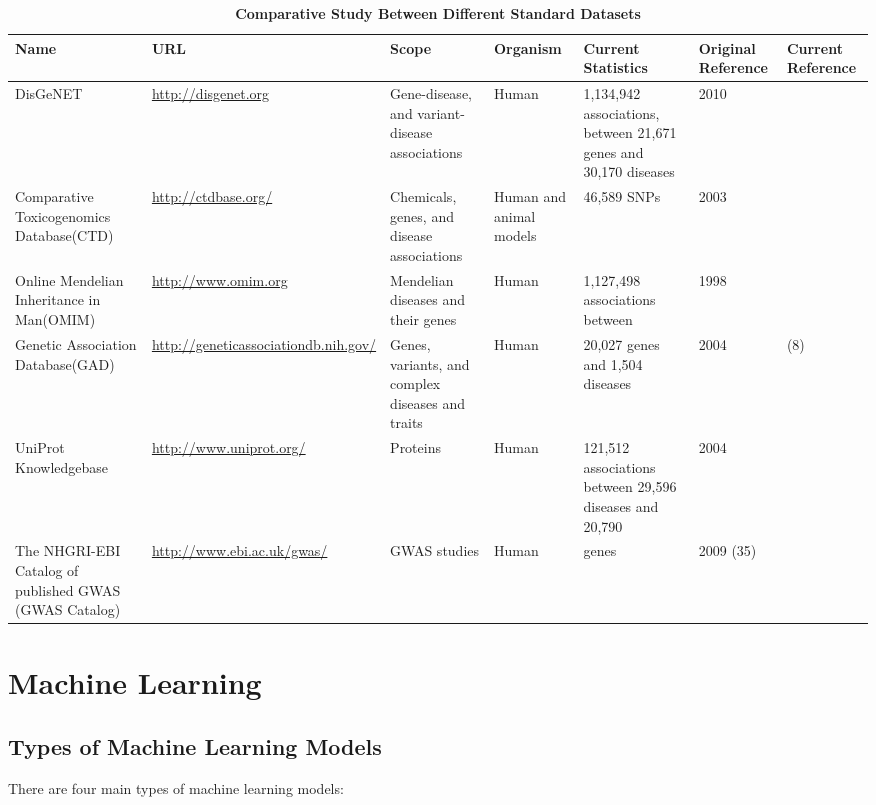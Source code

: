 \begin{table}
		\begin{tabularx}{\textwidth}{|X|X|X|X|X|X|X|}
			\hline 
			\textbf{Name} & \textbf{URL} & \textbf{Scope} & \textbf{Organism} & \textbf{Current Statistics} & \textbf{Original Reference} & \textbf{Current Reference} \\
			\hline 
			DisGeNET & \url{http://disgenet.org} & Gene-disease, and variant-disease associations & Human & 1,134,942 associations, between 21,671 genes and 30,170 diseases & 2010 \cite{31} & \cite{4} \\
			Comparative Toxicogenomics Database(CTD) & \url{http://ctdbase.org/} & Chemicals, genes, and disease associations & Human and animal models & 46,589 SNPs & 2003 \cite{32} & \cite{3} \\
			Online Mendelian Inheritance in Man(OMIM) & \url{http://www.omim.org} & Mendelian diseases and their genes & Human & 1,127,498 associations between & 1998 \cite{33} & \cite{2} \\
			Genetic Association Database(GAD) & \url{http://geneticassociationdb.nih.gov/} & Genes, variants, and complex diseases and traits & Human & 20,027 genes and 1,504 diseases & 2004 \cite{8} & (8) \\
			UniProt Knowledgebase & \url{http://www.uniprot.org/} & Proteins & Human & 121,512 associations between 29,596 diseases and 20,790 & 2004 \cite{34} & \cite{6} \\
			The NHGRI-EBI Catalog of published GWAS (GWAS Catalog) & \url{http://www.ebi.ac.uk/gwas/} & GWAS studies & Human & genes & 2009 (35) & \cite{9} \\
			\hline
		\end{tabularx}
		\caption{\textbf{Comparative Study Between Different Standard Datasets}}
		\label{tab:my_label}
\end{table}

\newpage


	

\section{Machine Learning}
\subsection{Types of Machine Learning Models}
There are four main types of machine learning models:

